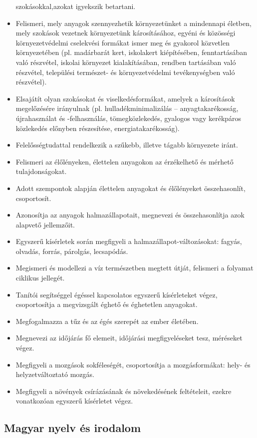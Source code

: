 \begin{itemize}
  szokásokkal,azokat igyekszik betartani.
\item
  Felismeri, mely anyagok szennyezhetik környezetünket a mindennapi
  életben, mely szokások vezetnek környezetünk károsításához, egyéni és
  közösségi környezetvédelmi cselekvési formákat ismer meg és gyakorol
  közvetlen környezetében (pl. madárbarát kert, iskolakert kiépítésében,
  fenntartásában való részvétel, iskolai környezet kialakításában,
  rendben tartásában való részvétel, települési természet- és
  környezetvédelmi tevékenységben való részvétel).
\item
  Elsajátít olyan szokásokat és viselkedésformákat, amelyek a
  károsítások megelőzésére irányulnak (pl. hulladékminimalizálás --
  anyagtakarékosság, újrahasználat és -felhasználás, tömegközlekedés,
  gyalogos vagy kerékpáros közlekedés előnyben részesítése,
  energiatakarékosság).
\item
  Felelősségtudattal rendelkezik a szűkebb, illetve tágabb környezete
  iránt.
\item
  Felismeri az élőlényeken, élettelen anyagokon az érzékelhető és
  mérhető tulajdonságokat.
\item
  Adott szempontok alapján élettelen anyagokat és élőlényeket
  összehasonlít, csoportosít.
\item
  Azonosítja az anyagok halmazállapotait, megnevezi és összehasonlítja
  azok alapvető jellemzőit.
\item
  Egyszerű kísérletek során megfigyeli a halmazállapot-változásokat:
  fagyás, olvadás, forrás, párolgás, lecsapódás.
\item
  Megismeri és modellezi a víz természetben megtett útját, felismeri a
  folyamat ciklikus jellegét.
\item
  Tanítói segítséggel égéssel kapcsolatos egyszerű kísérleteket végez,
  csoportosítja a megvizsgált éghető és éghetetlen anyagokat.
\item
  Megfogalmazza a tűz és az égés szerepét az ember életében.
\item
  Megnevezi az időjárás fő elemeit, időjárási megfigyeléseket tesz,
  méréseket végez.
\item
  Megfigyeli a mozgások sokféleségét, csoportosítja a mozgásformákat:
  hely- és helyzetváltoztató mozgás.
\item
  Megfigyeli a növények csírázásának és növekedésének feltételeit,
  ezekre vonatkozóan egyszerű kísérletet végez.
\end{itemize}

\hypertarget{magyar-nyelv-es-irodalom}{%
\subsection{Magyar nyelv és irodalom}\label{magyar-nyelv-es-irodalom}}

